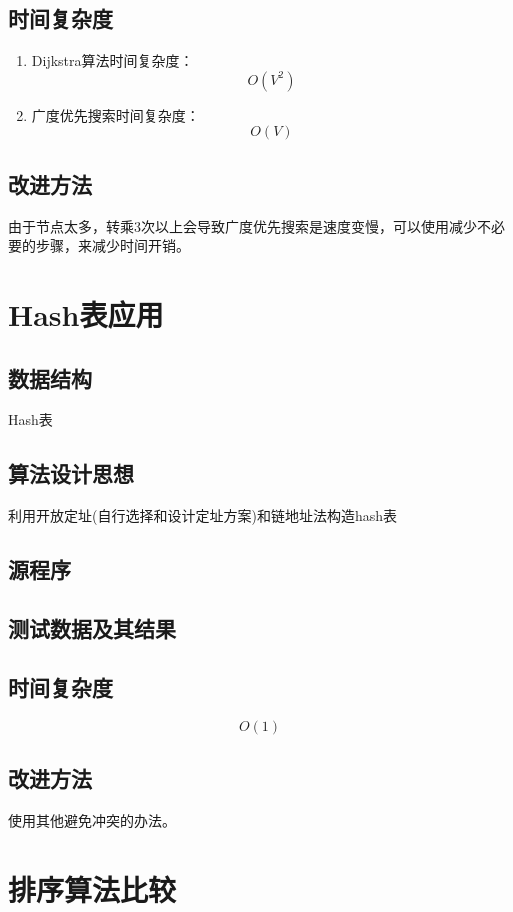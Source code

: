 \documentclass[a4paper,11pt,UTF8]{ctexart}
\begin{document}
\subsection{时间复杂度}
\begin{enumerate}
   \item Dijkstra算法时间复杂度：$$O(V^2)$$
   \item 广度优先搜索时间复杂度：$$O(V)$$
\end{enumerate}\par

\subsection{改进方法}
由于节点太多，转乘3次以上会导致广度优先搜索是速度变慢，可以使用减少不必要的步骤，来减少时间开销。

\section{Hash表应用}
\subsection{数据结构}
Hash表
\subsection{算法设计思想}
利用开放定址(自行选择和设计定址方案)和链地址法构造hash表

\subsection{源程序}



\subsection{测试数据及其结果}

\subsection{时间复杂度}
$$O(1)$$
\subsection{改进方法}
使用其他避免冲突的办法。

\section{排序算法比较}
\end{document}
